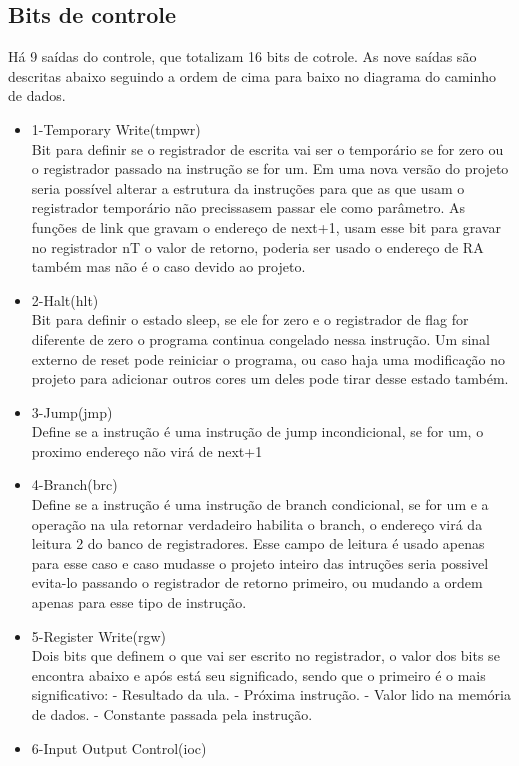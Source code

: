 \documentclass[a4paper, 10pt]{article}
\begin{document}
\subsection{Bits de controle}
Há 9 saídas do controle, que totalizam 16 bits de cotrole. As nove saídas são descritas abaixo seguindo a ordem de cima para baixo no diagrama do caminho de dados.
\begin{itemize}
	\item 1-Temporary Write(tmpwr)\\
	Bit para definir se o registrador de escrita vai ser o temporário se for zero ou o registrador passado na instrução se for um. Em uma nova versão do projeto seria possível alterar a estrutura da instruções para que as que usam o registrador temporário não precissasem passar ele como parâmetro. As funções de link que gravam o endereço de next+1, usam esse bit para gravar no registrador nT o valor de retorno, poderia ser usado o endereço de RA também mas não é o caso devido ao projeto.
	\item 2-Halt(hlt)\\
	Bit para definir o estado sleep, se ele for zero e o registrador de flag for diferente de zero o programa continua congelado nessa instrução. Um sinal externo de reset pode reiniciar o programa, ou caso haja uma modificação no projeto para adicionar outros cores um deles pode tirar desse estado também.
	\item 3-Jump(jmp)\\
	Define se a instrução é uma instrução de jump incondicional, se for um, o proximo endereço não virá de next+1
	\item 4-Branch(brc)\\
	Define se a instrução é uma instrução de branch condicional, se for um e a operação na ula retornar verdadeiro habilita o branch, o endereço virá da leitura 2 do banco de registradores. Esse campo de leitura é usado apenas para esse caso e caso mudasse o projeto inteiro das intruções seria possivel evita-lo passando o registrador de retorno primeiro, ou mudando a ordem apenas para esse tipo de instrução.
	\item 5-Register Write(rgw)\\
	Dois bits que definem o que vai ser escrito no registrador, o valor dos bits se encontra abaixo e após está seu significado, sendo que o primeiro é o mais significativo: 
	 - Resultado da ula.
	 - Próxima instrução.
	 - Valor lido na memória de dados.
	 - Constante passada pela instrução.
	\item 6-Input Output Control(ioc)\\

\end{itemize}
\end{document}
